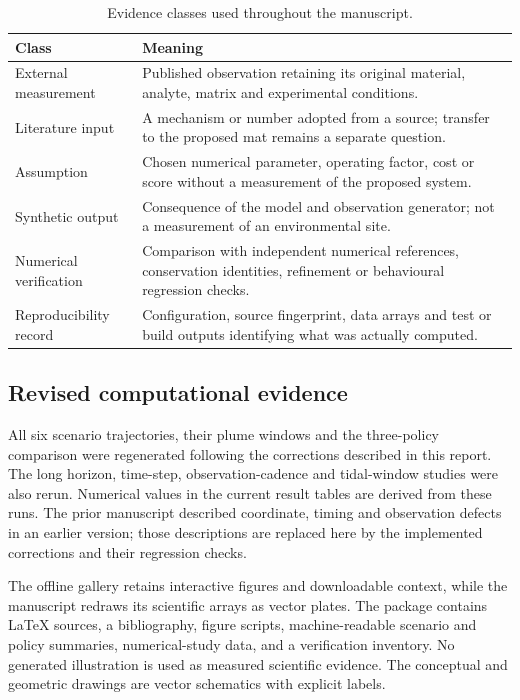 \begin{table}[htbp]\centering\small
\caption{Evidence classes used throughout the manuscript.}\label{tab:evidence-classes}
\begin{tabular}{p{.23\linewidth}p{.66\linewidth}}\toprule
Class & Meaning\\\midrule
External measurement & Published observation retaining its original material, analyte, matrix and experimental conditions.\\
Literature input & A mechanism or number adopted from a source; transfer to the proposed mat remains a separate question.\\
Assumption & Chosen numerical parameter, operating factor, cost or score without a measurement of the proposed system.\\
Synthetic output & Consequence of the model and observation generator; not a measurement of an environmental site.\\
Numerical verification & Comparison with independent numerical references, conservation identities, refinement or behavioural regression checks.\\
Reproducibility record & Configuration, source fingerprint, data arrays and test or build outputs identifying what was actually computed.\\
\bottomrule\end{tabular}\end{table}

\subsection{Revised computational evidence}
All six scenario trajectories, their plume windows and the three-policy comparison were regenerated following the corrections described in this report. The long horizon, time-step, observation-cadence and tidal-window studies were also rerun. Numerical values in the current result tables are derived from these runs. The prior manuscript described coordinate, timing and observation defects in an earlier version; those descriptions are replaced here by the implemented corrections and their regression checks.

The offline gallery retains interactive figures and downloadable context, while the manuscript redraws its scientific arrays as vector plates. The package contains LaTeX sources, a bibliography, figure scripts, machine-readable scenario and policy summaries, numerical-study data, and a verification inventory. No generated illustration is used as measured scientific evidence. The conceptual and geometric drawings are vector schematics with explicit labels.

